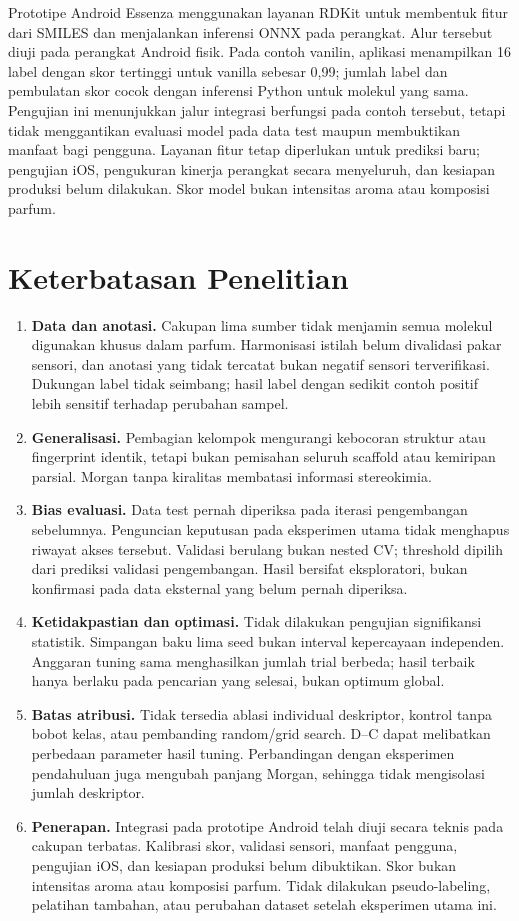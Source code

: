 Prototipe Android Essenza menggunakan layanan RDKit untuk membentuk fitur dari SMILES dan menjalankan inferensi ONNX pada perangkat. Alur tersebut diuji pada perangkat Android fisik. Pada contoh vanilin, aplikasi menampilkan 16 label dengan skor tertinggi untuk vanilla sebesar 0,99; jumlah label dan pembulatan skor cocok dengan inferensi Python untuk molekul yang sama. Pengujian ini menunjukkan jalur integrasi berfungsi pada contoh tersebut, tetapi tidak menggantikan evaluasi model pada data test maupun membuktikan manfaat bagi pengguna. Layanan fitur tetap diperlukan untuk prediksi baru; pengujian iOS, pengukuran kinerja perangkat secara menyeluruh, dan kesiapan produksi belum dilakukan. Skor model bukan intensitas aroma atau komposisi parfum.

\section{Keterbatasan Penelitian}
\begin{enumerate}
    \item \textbf{Data dan anotasi.} Cakupan lima sumber tidak menjamin semua molekul digunakan khusus dalam parfum. Harmonisasi istilah belum divalidasi pakar sensori, dan anotasi yang tidak tercatat bukan negatif sensori terverifikasi. Dukungan label tidak seimbang; hasil label dengan sedikit contoh positif lebih sensitif terhadap perubahan sampel.
    \item \textbf{Generalisasi.} Pembagian kelompok mengurangi kebocoran struktur atau fingerprint identik, tetapi bukan pemisahan seluruh scaffold atau kemiripan parsial. Morgan tanpa kiralitas membatasi informasi stereokimia.
    \item \textbf{Bias evaluasi.} Data test pernah diperiksa pada iterasi pengembangan sebelumnya. Penguncian keputusan pada eksperimen utama tidak menghapus riwayat akses tersebut. Validasi berulang bukan nested CV; threshold dipilih dari prediksi validasi pengembangan. Hasil bersifat eksploratori, bukan konfirmasi pada data eksternal yang belum pernah diperiksa.
    \item \textbf{Ketidakpastian dan optimasi.} Tidak dilakukan pengujian signifikansi statistik. Simpangan baku lima seed bukan interval kepercayaan independen. Anggaran tuning sama menghasilkan jumlah trial berbeda; hasil terbaik hanya berlaku pada pencarian yang selesai, bukan optimum global.
    \item \textbf{Batas atribusi.} Tidak tersedia ablasi individual deskriptor, kontrol tanpa bobot kelas, atau pembanding random/grid search. D--C dapat melibatkan perbedaan parameter hasil tuning. Perbandingan dengan eksperimen pendahuluan juga mengubah panjang Morgan, sehingga tidak mengisolasi jumlah deskriptor.
    \item \textbf{Penerapan.} Integrasi pada prototipe Android telah diuji secara teknis pada cakupan terbatas. Kalibrasi skor, validasi sensori, manfaat pengguna, pengujian iOS, dan kesiapan produksi belum dibuktikan. Skor bukan intensitas aroma atau komposisi parfum. Tidak dilakukan pseudo-labeling, pelatihan tambahan, atau perubahan dataset setelah eksperimen utama ini.
\end{enumerate}

